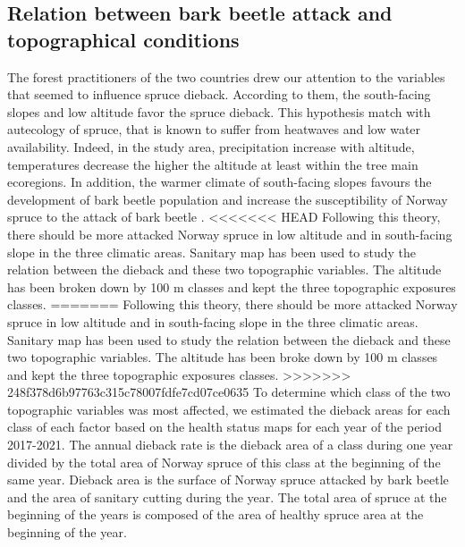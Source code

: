 \documentclass[3p,procedia]{elsarticle}
\begin{document}
\subsection{Relation between bark beetle attack and topographical conditions}

The forest practitioners of the two countries drew our attention to the variables that seemed to influence spruce dieback.
According to them, the south-facing slopes and low altitude favor the spruce dieback.
This hypothesis match with autecology of spruce, that is known to suffer from heatwaves and low water availability.
Indeed, in the study area, precipitation increase with altitude, temperatures decrease the higher the altitude at least within the tree main ecoregions.
In addition, the warmer climate of south-facing slopes favours the development of bark beetle population \citep{annila_influence_1969, baier_phenipscomprehensive_2007, jonsson_2009, marini_climate_2012} and increase the susceptibility of Norway spruce to the attack of bark beetle \citep{wermelinger_ecology_2004, netherer_waterlimiting_2015}.
<<<<<<< HEAD
Following this theory, there should be more attacked Norway spruce in low altitude and in south-facing slope in the three climatic areas.  
Sanitary map has been used to study the relation between the dieback and these two topographic variables.
The altitude has been broken down  by 100 m classes and kept the three topographic exposures classes.
=======
Following this theory, there should be more attacked Norway spruce in low altitude and in south-facing slope in the three climatic areas.
Sanitary map has been used to study the relation between the dieback and these two topographic variables.
The altitude has been broke down  by 100 m classes and kept the three topographic exposures classes.
>>>>>>> 248f378d6b97763c315c78007fdfe7cd07ce0635
To determine which class of the two topographic variables was most affected, we estimated the dieback areas for each class of each factor based on the health status maps for each year of the period 2017-2021.
The  annual dieback rate is  the dieback area of a class during one year divided by the total area of Norway spruce of this class at the beginning of the same year. 
Dieback area is the surface of Norway spruce attacked by bark beetle and the area of sanitary cutting during the year. 
The total area of spruce at the beginning of the years is composed of the area of healthy spruce area at the beginning of the year. 
\end{document}
